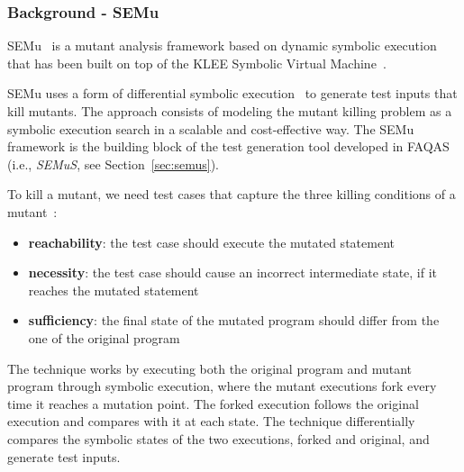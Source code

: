 
\subsubsection{Background - SEMu}
\label{klee-semu}

\STARTCHANGEDWPT

SEMu~\cite{chekam2021killing} is a mutant analysis  framework based on dynamic symbolic execution that has been built on top of the KLEE Symbolic Virtual Machine~\cite{cadar2008klee}.

SEMu uses a form of differential symbolic execution~\cite{} to generate test inputs that kill mutants. The approach consists of modeling the mutant killing problem as a symbolic execution search in a scalable and cost-effective way. 
The SEMu framework is the building block of 
the test generation tool developed in FAQAS (i.e., \emph{SEMuS}, see Section~\ref{sec:semus}).

To kill a mutant, we need test cases that capture the three killing conditions of a mutant~\cite{offutt1997automatically}: 
\begin{itemize}
	\item \textbf{reachability}: the test case should execute the mutated statement
	\item \textbf{necessity}: the test case should cause an incorrect intermediate state, if it reaches the mutated statement
	\item \textbf{sufficiency}: the final state of the mutated program should differ from the one of the original program
\end{itemize}

The technique works by executing both the original program and mutant program through symbolic execution, where the mutant executions fork every time it reaches a mutation point. 
The forked execution follows the original execution and compares with it at each state. 
The technique differentially compares the symbolic states of the two executions, forked and original, and generate test inputs. 

